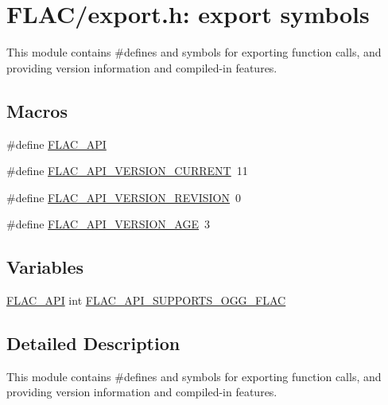 \hypertarget{group__flac__export}{}\section{F\+L\+A\+C/export.h\+: export symbols}
\label{group__flac__export}


This module contains \#defines and symbols for exporting function calls, and providing version information and compiled-\/in features.  


\subsection*{Macros}
\begin{DoxyCompactItemize}
\item 
\#define \mbox{\hyperlink{group__flac__export_ga56ca07df8a23310707732b1c0007d6f5}{F\+L\+A\+C\+\_\+\+A\+PI}}
\item 
\#define \mbox{\hyperlink{group__flac__export_ga31180fe15eea416cd8957cfca1a4c4f8}{F\+L\+A\+C\+\_\+\+A\+P\+I\+\_\+\+V\+E\+R\+S\+I\+O\+N\+\_\+\+C\+U\+R\+R\+E\+NT}}~11
\item 
\#define \mbox{\hyperlink{group__flac__export_ga811641dd9f8c542d9260240e7fbe8e93}{F\+L\+A\+C\+\_\+\+A\+P\+I\+\_\+\+V\+E\+R\+S\+I\+O\+N\+\_\+\+R\+E\+V\+I\+S\+I\+ON}}~0
\item 
\#define \mbox{\hyperlink{group__flac__export_ga1add3e09c8dfd57e8c921f299f0bbec1}{F\+L\+A\+C\+\_\+\+A\+P\+I\+\_\+\+V\+E\+R\+S\+I\+O\+N\+\_\+\+A\+GE}}~3
\end{DoxyCompactItemize}
\subsection*{Variables}
\begin{DoxyCompactItemize}
\item 
\mbox{\hyperlink{group__flac__export_ga56ca07df8a23310707732b1c0007d6f5}{F\+L\+A\+C\+\_\+\+A\+PI}} int \mbox{\hyperlink{group__flac__export_gaf762876dd61fbf2da1bef49762900533}{F\+L\+A\+C\+\_\+\+A\+P\+I\+\_\+\+S\+U\+P\+P\+O\+R\+T\+S\+\_\+\+O\+G\+G\+\_\+\+F\+L\+AC}}
\end{DoxyCompactItemize}


\subsection{Detailed Description}
This module contains \#defines and symbols for exporting function calls, and providing version information and compiled-\/in features. 

